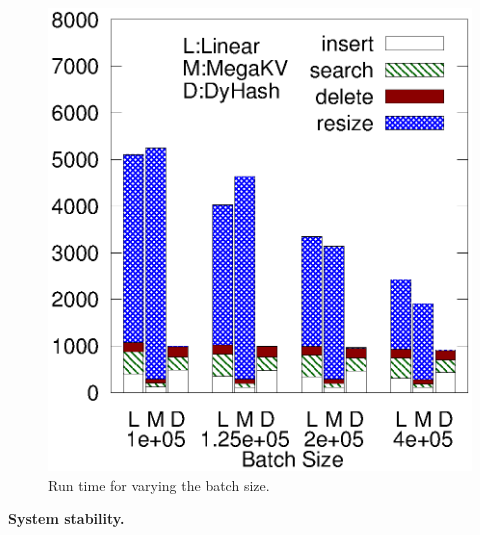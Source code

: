 \begin{figure}[h]
\begin{minipage}{0.18\linewidth}
		\centerline{\dsali}
	\end{minipage}
	\hfill
	\begin{minipage}{0.18\linewidth}\centering
		\includegraphics[width=\linewidth]{pic/dynamic/random/diff_batch_size.eps}
		\centerline{\dsrandom}
	\end{minipage}
	\caption{Run time for varying the batch size.}
	\label{fig:vary-batch-size}
\end{figure}

\vspace{1mm}\noindent\textbf{System stability.}

